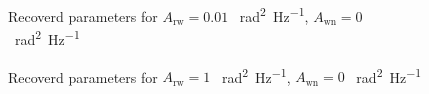 \documentclass[ fontsize=11pt]{scrartcl} %
\numberwithin{equation}{section} %
\numberwithin{figure}{section} %
\numberwithin{table}{section} %
\begin{document}
\pagebreak

\begin{figure}[hbtp]
\centering
\caption{Recoverd parameters for $A_{\text{rw}}=0.01$ \SI{}{\radian\squared\per\hertz}, $A_{\text{wn}}=0$ \SI{}{\radian\squared\per\hertz}}
\label{recovery_Noise0_Rand-2}
\end{figure}

\begin{figure}[hbtp]
\centering
\caption{Recoverd parameters for $A_{\text{rw}}=1$ \SI{}{\radian\squared\per\hertz}, $A_{\text{wn}}=0$ \SI{}{\radian\squared\per\hertz}}
\label{recovery_Noise0_Rand1}
\end{figure}
\end{document}
